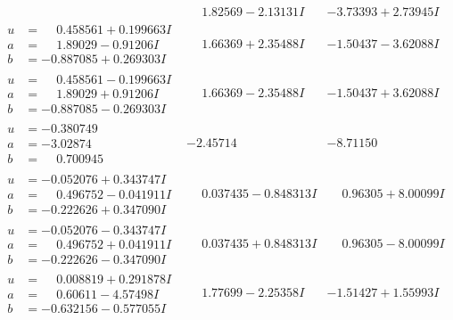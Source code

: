 \documentclass[1p]{elsarticle_modified}
\theoremstyle{definition}
\begin{document}
$$\begin{array}{c|c|c}
 & \phantom{-}1.82569 - 2.13131 I & -3.73393 + 2.73945 I \\ \hline\begin{aligned}
u &= \phantom{-}0.458561 + 0.199663 I \\
a &= \phantom{-}1.89029 - 0.91206 I \\
b &= -0.887085 + 0.269303 I\end{aligned}
 & \phantom{-}1.66369 + 2.35488 I & -1.50437 - 3.62088 I \\ \hline\begin{aligned}
u &= \phantom{-}0.458561 - 0.199663 I \\
a &= \phantom{-}1.89029 + 0.91206 I \\
b &= -0.887085 - 0.269303 I\end{aligned}
 & \phantom{-}1.66369 - 2.35488 I & -1.50437 + 3.62088 I \\ \hline\begin{aligned}
u &= -0.380749\phantom{ +0.000000I} \\
a &= -3.02874\phantom{ +0.000000I} \\
b &= \phantom{-}0.700945\phantom{ +0.000000I}\end{aligned}
 & -2.45714\phantom{ +0.000000I} & -8.71150\phantom{ +0.000000I} \\ \hline\begin{aligned}
u &= -0.052076 + 0.343747 I \\
a &= \phantom{-}0.496752 - 0.041911 I \\
b &= -0.222626 + 0.347090 I\end{aligned}
 & \phantom{-}0.037435 - 0.848313 I & \phantom{-}0.96305 + 8.00099 I \\ \hline\begin{aligned}
u &= -0.052076 - 0.343747 I \\
a &= \phantom{-}0.496752 + 0.041911 I \\
b &= -0.222626 - 0.347090 I\end{aligned}
 & \phantom{-}0.037435 + 0.848313 I & \phantom{-}0.96305 - 8.00099 I \\ \hline\begin{aligned}
u &= \phantom{-}0.008819 + 0.291878 I \\
a &= \phantom{-}0.60611 - 4.57498 I \\
b &= -0.632156 - 0.577055 I\end{aligned}
 & \phantom{-}1.77699 - 2.25358 I & -1.51427 + 1.55993 I \\ \hline\begin{aligned}

\end{aligned}
\end{array}$$
\end{document}
